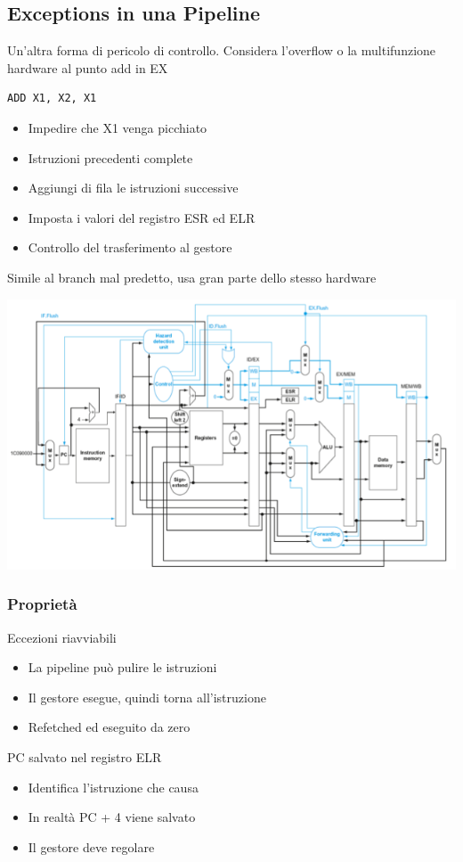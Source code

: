 \documentclass[12pt,a4paper]{article}
\begin{document}
\subsection{Exceptions in una Pipeline}
Un'altra forma di pericolo di controllo. Considera l'overflow o la multifunzione hardware al punto add in EX
\begin{verbatim}ADD X1, X2, X1\end{verbatim}
\begin{itemize}
\item Impedire che X1 venga picchiato
\item Istruzioni precedenti complete
\item Aggiungi di fila le istruzioni successive
\item Imposta i valori del registro ESR ed ELR
\item Controllo del trasferimento al gestore
\end{itemize}
Simile al branch mal predetto, usa gran parte dello stesso hardware
\begin{center}
\includegraphics[width=0.6\columnwidth]{img/pipeline_exeption.png}
\end{center}
\subsubsection{Proprietà}
Eccezioni riavviabili
\begin{itemize}
\item La pipeline può pulire le istruzioni
\item Il gestore esegue, quindi torna all'istruzione
\item Refetched ed eseguito da zero
\end{itemize}
PC salvato nel registro ELR
\begin{itemize}
\item Identifica l'istruzione che causa
\item In realtà PC + 4 viene salvato
\item Il gestore deve regolare
\end{itemize}
\end{document}
